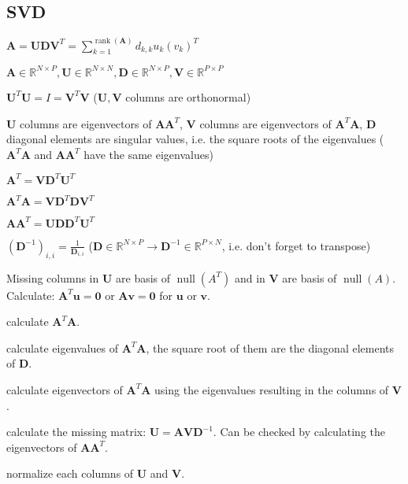 \documentclass[a4paper, 11pt, landscape]{article}
\begin{document}
\begin{multicols*}{3}
\section{SVD}
\begin{compactitem}
	\item $\mathbf{A} = \mathbf{U} \mathbf{D} \mathbf{V}^T = \sum_{k=1}^{\operatorname{rank}(\mathbf{A})} d_{k,k} u_k (v_k)^T$
	\item $\mathbf{A} \in \mathbb{R}^{N \times P}, \mathbf{U} \in \mathbb{R}^{N \times N}, \mathbf{D} \in \mathbb{R}^{N \times P}, \mathbf{V} \in \mathbb{R}^{P \times P}$
	\item $\mathbf{U}^T \mathbf{U} = I = \mathbf{V}^T \mathbf{V}$ ($\mathbf{U}, \mathbf{V}$ columns are orthonormal)
	\item $\mathbf{U}$ columns are eigenvectors of $\mathbf{A} \mathbf{A}^T$, $\mathbf{V}$ columns are eigenvectors of $\mathbf{A}^T \mathbf{A}$, $\mathbf{D}$ diagonal elements are singular values, i.e. the square roots of the eigenvalues ($\mathbf{A}^T \mathbf{A}$ and $\mathbf{A} \mathbf{A}^T$ have the same eigenvalues)
	\begin{listcols}
		\item $\mathbf{A}^T = \mathbf{V} \mathbf{D}^T \mathbf{U}^T$
		\item $\mathbf{A}^T \mathbf{A} = \mathbf{V} \mathbf{D}^T \mathbf{D} \mathbf{V}^T$
		\item $\mathbf{A} \mathbf{A}^T = \mathbf{U} \mathbf{D} \mathbf{D}^T \mathbf{U}^T$
	\end{listcols}
	\item $(\mathbf{D}^{-1})_{i,i} = \frac{1}{\mathbf{D}_{i, i}}$ ($\mathbf{D} \in \mathbb{R}^{N \times P} \to \mathbf{D}^{-1} \in \mathbb{R}^{P \times N}$, i.e. don't forget to transpose)
	\item Missing columns in $\mathbf{U}$ are basis of $\operatorname{null}(A^T)$ and in $\mathbf{V}$ are basis of $\operatorname{null}(A)$. Calculate: $\mathbf{A}^T \mathbf{u} = \mathbf{0}$ or $\mathbf{A} \mathbf{v} = \mathbf{0}$ for $\mathbf{u}$ or $\mathbf{v}$.
\end{compactitem}

\begin{compactenum}
	\item calculate $\mathbf{A}^T \mathbf{A}$.
	\item calculate eigenvalues of $\mathbf{A}^T \mathbf{A}$, the square root of them are the diagonal elements of $\mathbf{D}$.
	\item calculate eigenvectors of $\mathbf{A}^T \mathbf{A}$ using the eigenvalues resulting in the columns of $\mathbf{V}$.
	\item calculate the missing matrix: $\mathbf{U} = \mathbf{A} \mathbf{V} \mathbf{D}^{-1}$. Can be checked by calculating the eigenvectors of $\mathbf{A} \mathbf{A}^T$.
	\item normalize each columns of $\mathbf{U}$ and $\mathbf{V}$.
\end{compactenum}


\end{multicols*}
\end{document}
